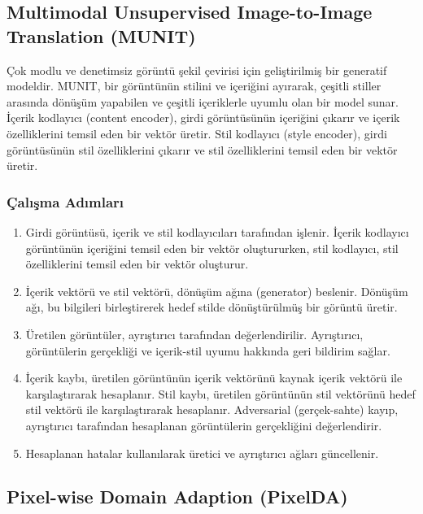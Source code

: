 \newpage

\subsection{Multimodal Unsupervised Image-to-Image Translation (MUNIT)}

Çok modlu ve denetimsiz görüntü şekil çevirisi için geliştirilmiş bir generatif modeldir. MUNIT, bir görüntünün stilini ve içeriğini ayırarak, çeşitli stiller arasında dönüşüm yapabilen ve çeşitli içeriklerle uyumlu olan bir model sunar. İçerik kodlayıcı (content encoder), girdi görüntüsünün içeriğini çıkarır ve içerik özelliklerini temsil eden bir vektör üretir. Stil kodlayıcı (style encoder), girdi görüntüsünün stil özelliklerini çıkarır ve stil özelliklerini temsil eden bir vektör üretir.

\subsubsection{Çalışma Adımları}

\begin{enumerate}
    \item Girdi görüntüsü, içerik ve stil kodlayıcıları tarafından işlenir. İçerik kodlayıcı görüntünün içeriğini temsil eden bir vektör oluştururken, stil kodlayıcı, stil özelliklerini temsil eden bir vektör oluşturur.
    \item İçerik vektörü ve stil vektörü, dönüşüm ağına (generator) beslenir. Dönüşüm ağı, bu bilgileri birleştirerek hedef stilde dönüştürülmüş bir görüntü üretir.
    \item Üretilen görüntüler, ayrıştırıcı tarafından değerlendirilir. Ayrıştırıcı, görüntülerin gerçekliği ve içerik-stil uyumu hakkında geri bildirim sağlar.
    \item İçerik kaybı, üretilen görüntünün içerik vektörünü kaynak içerik vektörü ile karşılaştırarak hesaplanır. Stil kaybı, üretilen görüntünün stil vektörünü hedef stil vektörü ile karşılaştırarak hesaplanır. Adversarial (gerçek-sahte) kayıp, ayrıştırıcı tarafından hesaplanan görüntülerin gerçekliğini değerlendirir.
    \item Hesaplanan hatalar kullanılarak üretici ve ayrıştırıcı ağları güncellenir.
\end{enumerate}

\newpage

\subsection{Pixel-wise Domain Adaption (PixelDA)}

